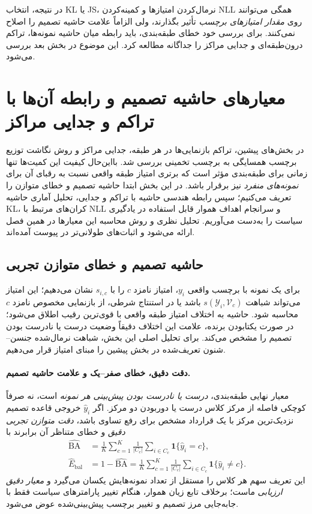 در نتیجه، انتخاب KL یا JS،
نرمال‌کردن امتیازها و کمینه‌کردن
NLL همگی می‌توانند روی
\emph{مقدار امتیازهای برچسب}
تأثیر بگذارند، ولی الزاماً
علامت حاشیه تصمیم را اصلاح نمی‌کنند.
برای بررسی خود خطای طبقه‌بندی،
باید رابطه میان حاشیه نمونه‌ها،
تراکم درون‌طبقه‌ای و جدایی مراکز
را جداگانه مطالعه کرد.
این موضوع در بخش بعد بررسی می‌شود.

\section{معیارهای حاشیه تصمیم و رابطه آن‌ها با تراکم و جدایی مراکز}
\label{sec:ch3-normalized-margin}

در بخش‌های پیشین، تراکم بازنمایی‌ها در هر طبقه،
جدایی مراکز و روش نگاشت توزیع برچسب همسایگی
به برچسب تخمینی بررسی شد. بااین‌حال
کیفیت این کمیت‌ها تنها زمانی برای طبقه‌بندی
مؤثر است که برتری امتیاز طبقه واقعی
نسبت به رقبای آن برای \emph{نمونه‌های منفرد}
نیز برقرار باشد. در این بخش ابتدا
حاشیه تصمیم و خطای متوازن را تعریف می‌کنیم؛
سپس رابطه هندسی حاشیه با تراکم و جدایی،
تحلیل آماری حاشیه KL، کران‌های
مرتبط با NLL و سرانجام اهداف هموار
قابل استفاده در یادگیری سیاست
را به‌دست می‌آوریم. تحلیل نظری
و روش محاسبه این معیارها در همین فصل
ارائه می‌شود و اثبات‌های طولانی‌تر
در پیوست آمده‌اند.

\subsection{حاشیه تصمیم و خطای متوازن تجربی}
\label{subsec:ch3-decision-margin-empirical}
برای یک نمونه با برچسب واقعی $y_i$،
امتیاز نامزد $c$ را با $s_{i,c}$
نشان می‌دهیم؛ این امتیاز می‌تواند
شباهت $s(\mathscr Y_i,\mathcal V_c)$
باشد یا در استنتاج شرطی، از
بازنمایی مخصوص نامزد $c$ محاسبه شود.
حاشیه به اختلاف امتیاز طبقه واقعی
با قوی‌ترین رقیب اطلاق می‌شود؛
در صورت یکتابودن برنده، علامت
این اختلاف دقیقاً وضعیت درست یا
نادرست بودن تصمیم را مشخص می‌کند.
برای تحلیل اصلی این بخش،
شباهت نرمال‌شده جنسن--شنون
تعریف‌شده در بخش پیشین را
مبنای امتیاز قرار می‌دهیم.

\paragraph{دقت دقیق، خطای صفر--یک و علامت حاشیه تصمیم.}
معیار نهایی طبقه‌بندی، \emph{درست یا نادرست بودن پیش‌بینی هر نمونه} است،
نه صرفاً کوچکی فاصله از مرکز کلاس درست یا دوربودن دو مرکز.
اگر $\widehat y_i$ خروجی قاعده تصمیم نزدیک‌ترین مرکز
با یک قرارداد مشخص برای رفع تساوی باشد،
\emph{دقت متوازن تجربی دقیق} و خطای متناظر آن برابرند با
\begin{equation}\label{eq:ch3-js-exact-balanced-accuracy}
\boxed{
\begin{aligned}
\widehat{\mathrm{BA}}
&=\frac1K\sum_{c=1}^{K}\frac1{|C_c|}
\sum_{i\in C_c}\mathbf1\{\widehat y_i=c\},\\
\widehat E_{\mathrm{bal}}
&=1-\widehat{\mathrm{BA}}
=\frac1K\sum_{c=1}^{K}\frac1{|C_c|}
\sum_{i\in C_c}\mathbf1\{\widehat y_i\ne c\}.
\end{aligned}}
\end{equation}
این تعریف سهم هر کلاس را مستقل از تعداد نمونه‌هایش یکسان می‌گیرد
و \emph{معیار دقیق ارزیابی} ماست؛ برخلاف تابع زیان هموار،
هنگام تغییر پارامترهای سیاست فقط با جابه‌جایی مرز تصمیم
و تغییر برچسب پیش‌بینی‌شده عوض می‌شود.

